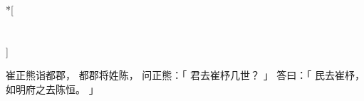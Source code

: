 
\switchcolumn[0]*[\section{}]

崔正熊诣都郡，
都郡将姓陈，
问正熊：「
    君去崔杼几世？
」
答曰：「
    民去崔杼，
    如明府之去陈恒。
」

\switchcolumn


